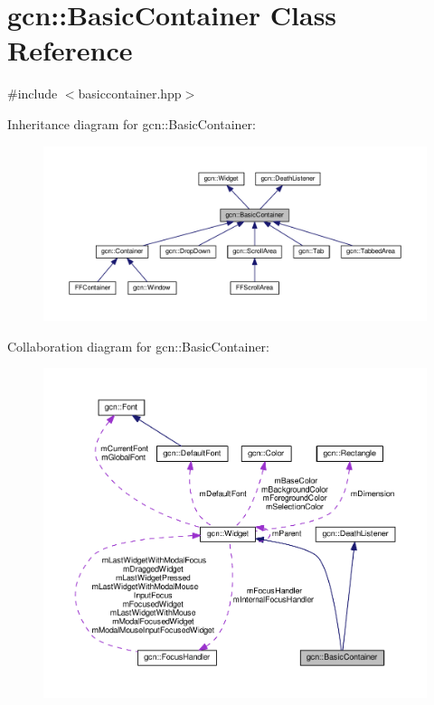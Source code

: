 \hypertarget{classgcn_1_1BasicContainer}{}\section{gcn\+:\+:Basic\+Container Class Reference}
\label{classgcn_1_1BasicContainer}


{\ttfamily \#include $<$basiccontainer.\+hpp$>$}



Inheritance diagram for gcn\+:\+:Basic\+Container\+:\nopagebreak
\begin{figure}[H]
\begin{center}
\leavevmode
\includegraphics[width=350pt]{classgcn_1_1BasicContainer__inherit__graph}
\end{center}
\end{figure}


Collaboration diagram for gcn\+:\+:Basic\+Container\+:\nopagebreak
\begin{figure}[H]
\begin{center}
\leavevmode
\includegraphics[width=350pt]{classgcn_1_1BasicContainer__coll__graph}
\end{center}
\end{figure}
